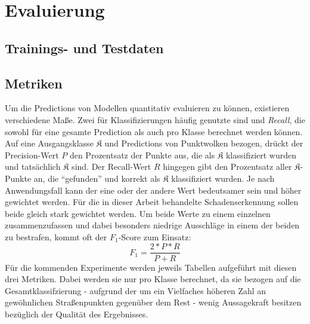 
\chapter{Evaluierung}

\section{Trainings- und Testdaten}

\section{Metriken}

Um die Predictions von Modellen quantitativ evaluieren zu können, existieren verschiedene Maße. Zwei für Klassifizierungen häufig genutzte sind  und \textit{Recall}, die sowohl für eine gesamte Prediction als auch pro Klasse berechnet werden können.  Auf eine Ausgangsklasse $\mathfrak{K}$ und Predictions von Punktwolken bezogen, drückt der Precision-Wert $P$ den Prozentsatz der Punkte aus, die als $\mathfrak{K}$ klassifiziert wurden und tatsächlich $\mathfrak{K}$ sind. Der Recall-Wert $R$ hingegen gibt den Prozentsatz aller $\mathfrak{K}$-Punkte an, die ``gefunden'' und korrekt als $\mathfrak{K}$ klassifiziert wurden. Je nach Anwendungsfall kann der eine oder der andere Wert bedeutsamer sein und höher gewichtet werden. Für die in dieser Arbeit behandelte Schadenserkennung sollen beide gleich stark gewichtet werden. Um beide Werte zu einem einzelnen zusammenzufassen und dabei besonders niedrige Ausschläge in einem der beiden zu bestrafen, kommt oft der $F_1$-Score zum Einsatz:
\begin{equation}
    F_1 = \frac{2 * P * R}{P + R}
\end{equation}
Für die kommenden Experimente werden jeweils Tabellen aufgeführt mit diesen drei Metriken. Dabei werden sie nur pro Klasse berechnet, da sie bezogen auf die Gesamtklassifzierung - aufgrund der um ein Vielfaches höheren Zahl an gewöhnlichen Straßenpunkten gegenüber dem Rest - wenig Aussagekraft besitzen bezüglich der Qualität des Ergebnisses.

